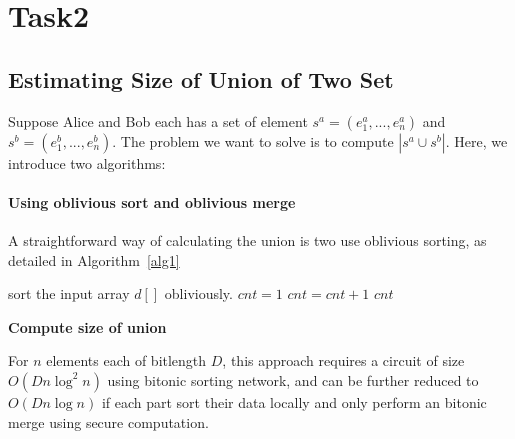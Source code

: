 \section{Task2}
\subsection{Estimating Size of Union of Two Set}
Suppose Alice and Bob each has a set of element $s^a = (e^a_1,...,e^a_n)$
and $s^b = (e^b_1,...,e^b_n)$. The problem we want to solve is 
to compute $|s^a\cup s^b|$. Here, we introduce two algorithms:

\paragraph{Using oblivious sort and oblivious merge}
A straightforward way of calculating the union is two use oblivious sorting, as detailed in Algorithm~\ref{alg1}

\begin{algorithm}[t]
\begin{algorithmic}[1]
\State sort the input array $d[]$ obliviously.
\State $cnt = 1$
		\State $cnt = cnt + 1$
	\EndIf
\EndFor
\State\Return $cnt$
\end{algorithmic}
\caption{\textbf{Compute size of union}} %
\label{alg1}
\end{algorithm}
For $n$ elements each of bitlength $D$, this approach requires a circuit of size $O(Dn\log^2n)$ using bitonic sorting network,
and can be further reduced to $O(Dn\log n)$ if each part sort their data locally and only perform an bitonic merge using secure computation.
